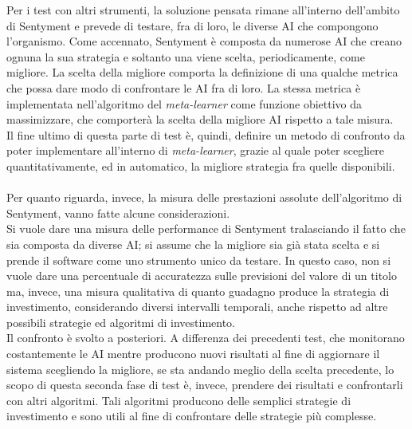 \documentclass[a4paper,12pt]{report}
\begin{document}
Per i test con altri strumenti, la soluzione pensata rimane all'interno dell'ambito di Sentyment e prevede di testare, fra di loro, le diverse AI che compongono l'organismo. Come accennato, Sentyment è composta da numerose AI che creano ognuna la sua strategia e soltanto una viene scelta, periodicamente, come migliore. La scelta della migliore comporta la definizione di una qualche metrica che possa dare modo di confrontare le AI fra di loro. La stessa metrica è implementata nell'algoritmo del \textit{meta-learner} come funzione obiettivo da massimizzare, che comporterà la scelta della migliore AI rispetto a tale misura.\\ Il fine ultimo di questa parte di test è, quindi, definire un metodo di confronto da poter implementare all'interno di \textit{meta-learner}, grazie al quale poter scegliere quantitativamente, ed in automatico, la migliore strategia fra quelle disponibili.\\~\\ Per quanto riguarda, invece, la misura delle prestazioni assolute dell'algoritmo di Sentyment, vanno fatte alcune considerazioni.\\ Si vuole dare una misura delle performance di Sentyment tralasciando il fatto che sia composta da diverse AI; si assume che la migliore sia già stata scelta e si prende il software come uno strumento unico da testare. In questo caso, non si vuole dare una percentuale di accuratezza sulle previsioni del valore di un titolo ma, invece, una misura qualitativa di quanto guadagno produce la strategia di investimento, considerando diversi intervalli temporali, anche rispetto ad altre possibili strategie ed algoritmi di investimento.\\ Il confronto è svolto a posteriori. A differenza dei precedenti test, che monitorano costantemente le AI mentre producono nuovi risultati al fine di aggiornare il sistema scegliendo la migliore, se sta andando meglio della scelta precedente, lo scopo di questa seconda fase di test è, invece, prendere dei risultati e confrontarli con altri algoritmi. Tali algoritmi producono delle semplici strategie di investimento e sono utili al fine di confrontare delle strategie più complesse.\\~\\
\end{document}
